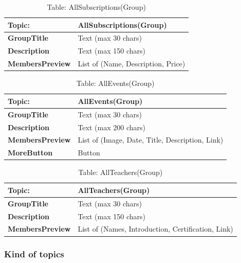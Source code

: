 \begin{table}[H]
\centering
\begin{tabularx}{\textwidth}{|>{\bfseries}l|X|}
\hline
Topic: & \textbf{AllSubscriptions(Group)} \\
\hline
GroupTitle & Text (max 30 chars) \\
\hline
Description & Text (max 150 chars) \\
\hline
MembersPreview & List of (Name, Description, Price) \\
\hline
\end{tabularx}
\caption{Table: AllSubscriptions(Group)}
\end{table}

\begin{table}[H]
\centering
\begin{tabularx}{\textwidth}{|>{\bfseries}l|X|}
\hline
Topic: & \textbf{AllEvents(Group)} \\
\hline
GroupTitle & Text (max 30 chars) \\
\hline
Description & Text (max 200 chars) \\
\hline
MembersPreview & List of (Image, Date, Title, Description, Link) \\
\hline
MoreButton & Button \\
\hline
\end{tabularx}
\caption{Table: AllEvents(Group)}
\end{table}

\begin{table}[H]
\centering
\begin{tabularx}{\textwidth}{|>{\bfseries}l|X|}
\hline
Topic: & \textbf{AllTeachers(Group)} \\
\hline
GroupTitle & Text (max 30 chars) \\
\hline
Description & Text (max 150 chars) \\
\hline
MembersPreview & List of (Names, Introduction, Certification, Link) \\
\hline
\end{tabularx}
\caption{Table: AllTeachers(Group)}
\end{table}

\subsubsection{Kind of topics}


